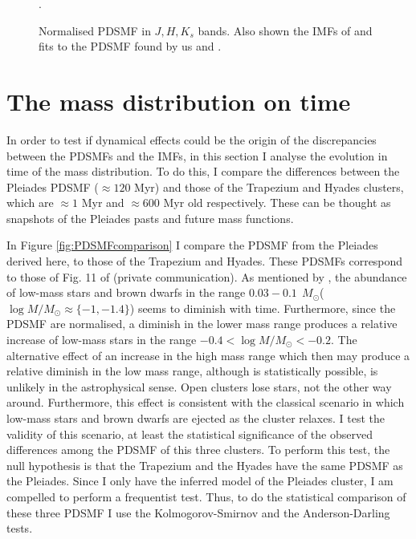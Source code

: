 \begin{figure}[htbp]
\begin{center}
\caption{Normalised PDSMF in $J,H,K_s$ bands. Also shown the IMFs of \citet{Chabrier2005, Thies2007} and fits to the PDSMF found by us and \citet{Bouy2015}.}
\label{fig:MassFunction}.
\end{center}
\end{figure}

\section{The mass distribution on time}
In order to test if dynamical effects could be the origin of the discrepancies between the PDSMFs and the IMFs, in this section I analyse the evolution in time of the mass distribution. To do this, I compare the differences between the Pleiades PDSMF ($\approx120$ Myr) and those of the Trapezium and Hyades clusters, which  are $\approx1$ Myr and $\approx 600$ Myr old respectively. These can be thought as snapshots of the Pleiades pasts and future mass functions.  

In Figure \ref{fig:PDSMFcomparison} I compare the PDSMF from the Pleiades derived here, to those of the Trapezium and Hyades. These PDSMFs correspond to those of  Fig. 11 of \citet{Bouy2015} (private communication). As mentioned by \citet{Bouy2015}, the abundance of low-mass stars and brown dwarfs in the range $0.03 - 0.1 \ \ M_{\odot}$($\log M/M_{\odot} \approx \{-1, -1.4\}$) seems to diminish with time. Furthermore, since the PDSMF are normalised, a diminish in the lower mass range produces a relative increase of low-mass stars in the range $-0.4 < \log M/M_{\odot} < -0.2$. The alternative effect of an increase in the high mass range which then may produce a relative diminish in the low mass range, although is statistically possible, is unlikely in the astrophysical sense. Open clusters lose stars, not the other way around. Furthermore, this effect is consistent with the classical scenario in which low-mass stars and brown dwarfs are ejected as the cluster relaxes. I test the validity of this scenario, at least the statistical significance of the observed differences among the PDSMF of this three clusters. To perform this test, the null hypothesis is that the Trapezium and the Hyades have the same PDSMF as the Pleiades. Since I only have the inferred model of the Pleiades cluster, I am compelled to perform a frequentist test. Thus, to do the statistical comparison of these three PDSMF I use the Kolmogorov-Smirnov and the Anderson-Darling tests. 

